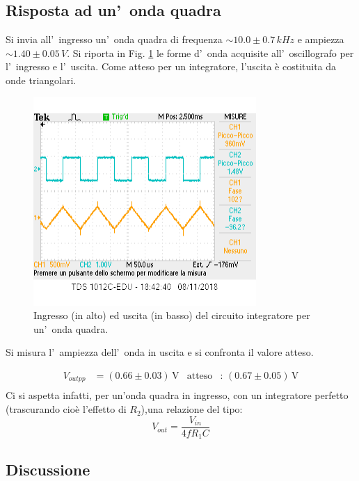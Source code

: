 \documentclass[10pt,a4paper]{article}
\begin{document}
	\subsection*{Risposta ad un'~onda quadra}
	Si invia all'~ingresso un'~onda quadra di frequenza $\sim 10.0\pm0.7 \,kHz$ e ampiezza $\sim 1.40\pm 0.05\,V$.
	Si riporta in Fig. \ref{fig:oscinte} le forme d'~onda acquisite all'~oscillografo per l'~ingresso
	e l'~uscita. 
	Come atteso per un integratore, l'uscita è costituita da onde triangolari.
	\begin{figure}[htb]
		\begin{center}

			\includegraphics[scale=0.8]{zanna.png}
		\end{center}
		\caption{\small Ingresso (in alto) ed uscita (in basso) del circuito integratore per un'~onda quadra.}
		\label{fig:oscinte}
	\end{figure}
	
	Si misura l'~ampiezza dell'~onda  in uscita e si confronta il valore atteso.
	
	\begin{align*}
	V_{out pp} &= (0.66\pm 0.03 )\,\mathrm{V} & \mathrm{atteso} &:\,(0.67\pm 0.05 )\, \mathrm{V}  \\
	\end{align*}
 	Ci si aspetta infatti, per un'onda quadra in ingresso, con un integratore perfetto (trascurando cioè l'effetto di $R_2$),una relazione del tipo: \[V_{out}=\frac{V_{in}}{4fR_{1}C}\]
	\clearpage
	\subsection{Discussione}
	
\end{document}
